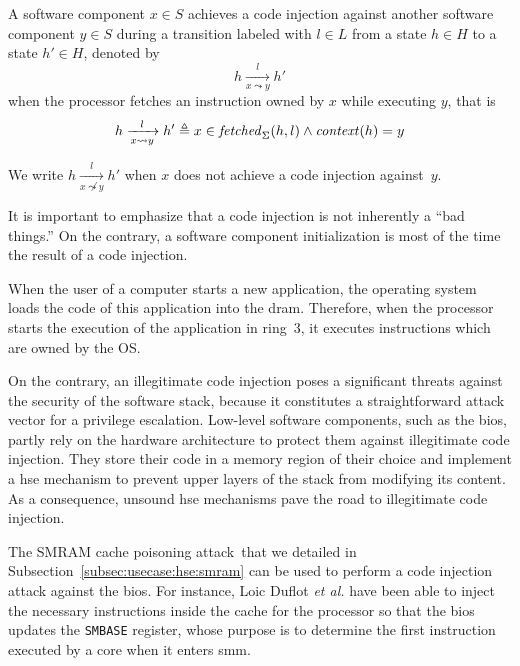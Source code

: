 \begin{definition}
  \label{def:speccert:tempering}
  A software component $x \in S$ achieves a code injection against another
  software component $y \in S$ during a transition labeled with $l \in L$ from
  a state $h \in H$ to a state $h' \in H$, denoted by
  \[
    h \xrightarrow[x \leadsto y]{l} h'
  \]
  when the processor fetches an instruction owned by $x$ while executing $y$,
  that is
  \[
    h \xrightarrow[x \leadsto y]{l} h' \triangleq x \in
    \mathit{fetched}_{\Sigma}(h, l) \wedge \mathit{context}(h) = y
  \]

  We write $h \xrightarrow[x \not\leadsto y]{l} h'$ when $x$ does not achieve a
  code injection against~$y$.
\end{definition}

It is important to emphasize that a code injection is not inherently a ``bad
things.''
%
On the contrary, a software component initialization is most of the time the
result of a code injection.

\begin{example}
  When the user of a computer starts a new application, the operating system
  loads the code of this application into the \ac{dram}.
  Therefore, when the processor starts the execution of the application in
  ring~3, it executes instructions which are owned by the OS.
\end{example}

On the contrary, an illegitimate code injection poses a significant threats
against the security of the software stack, because it constitutes a
straightforward attack vector for a privilege escalation.
%
Low-level software components, such as the \ac{bios}, partly rely on the
hardware architecture to protect them against illegitimate code injection.
%
They store their code in a memory region of their choice and implement a
\ac{hse} mechanism to prevent upper layers of the stack from modifying its
content.
%
As a consequence, unsound \ac{hse} mechanisms pave the road to illegitimate code
injection.

\begin{example}
  The SMRAM cache poisoning attack\,\cite{duflot2009smram,wojtczuk2009smram}
  that we detailed in Subsection~\ref{subsec:usecase:hse:smram} can be used to
  perform a code injection attack against the \ac{bios}.
  For instance, Loic Duflot \emph{et al.} have been able to inject the necessary
  instructions inside the cache for the processor so that the \ac{bios} updates
  the \texttt{SMBASE} register, whose purpose is to determine the first
  instruction executed by a core when it enters \ac{smm}.
\end{example}


